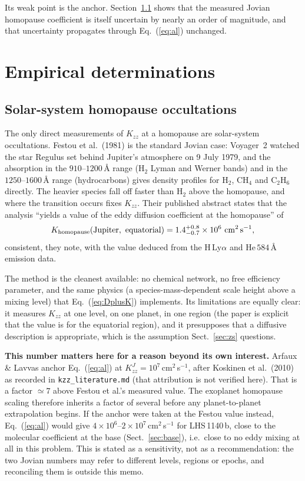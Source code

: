\documentclass[english,a4paper]{my_memo}
\begin{document}
Its weak point is the anchor. Section~\ref{sec:homo-obs} shows that the
measured Jovian homopause coefficient is itself uncertain by nearly an
order of magnitude, and that uncertainty propagates through
Eq.~(\ref{eq:al}) unchanged.

\section{Empirical determinations}
\label{sec:emp}

\subsection{Solar-system homopause occultations}
\label{sec:homo-obs}

The only direct measurements of $K_{zz}$ at a homopause are solar-system
occultations. Festou et al.\ (1981) is the standard Jovian case: Voyager~2
watched the star Regulus set behind Jupiter's atmosphere on 9 July 1979, and
the absorption in the $910$--$1200$\,\AA{} range (H$_2$ Lyman and Werner
bands) and in the $1250$--$1600$\,\AA{} range (hydrocarbons) gives density
profiles for H$_2$, CH$_4$ and C$_2$H$_6$ directly. The heavier species fall
off faster than H$_2$ above the homopause, and where the transition occurs
fixes $K_{zz}$. Their published abstract states that the analysis
``yields a value of the eddy diffusion coefficient at the homopause'' of
%
\begin{equation}
  K_{\rm homopause}({\rm Jupiter,\ equatorial})
  = 1.4^{+0.8}_{-0.7}\times10^{6}\ {\rm cm^{2}\,s^{-1}},
\end{equation}
%
consistent, they note, with the value deduced from the H\,Ly$\alpha$ and
He\,$584$\,\AA{} emission data.

The method is the cleanest available: no chemical network, no free
efficiency parameter, and the same physics (a species-mass-dependent scale
height above a mixing level) that Eq.~(\ref{eq:DplusK}) implements. Its
limitations are equally clear: it measures $K_{zz}$ at one level, on one
planet, in one region (the paper is explicit that the value is for the
equatorial region), and it presupposes that a diffusive description is
appropriate, which is the assumption Sect.~\ref{sec:zs} questions.

\medskip
\noindent\textbf{This number matters here for a reason beyond its own
interest.} Arfaux \& Lavvas anchor Eq.~(\ref{eq:al}) at
$K_{zz}^{J} = 10^{7}$\,cm$^{2}$\,s$^{-1}$, after Koskinen et al.\ (2010) as
recorded in \texttt{kzz\_literature.md} (that attribution is not verified
here). That is a factor $\simeq 7$ above Festou et al.'s measured value.
The exoplanet homopause scaling therefore inherits a factor of several
before any planet-to-planet extrapolation begins. If the anchor were taken
at the Festou value instead, Eq.~(\ref{eq:al}) would give
$4\times10^{6}$--$2\times10^{7}$\,cm$^{2}$\,s$^{-1}$ for LHS\,1140\,b, close
to the molecular coefficient at the base (Sect.~\ref{sec:base}), i.e.\
close to no eddy mixing at all in this problem. This is stated as a
sensitivity, not as a recommendation: the two Jovian numbers may refer to
different levels, regions or epochs, and reconciling them is outside this
memo.
\end{document}
